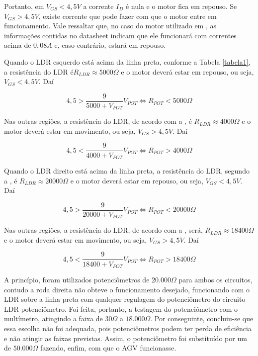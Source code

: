 \documentclass[portuguese]{textolivre}
\begin{document}
Portanto, em $V_{GS} < 4,5V$ a corrente $I_D$ é nula e o motor fica em repouso. Se $V_{GS} > 4,5V$, existe corrente que pode fazer com que o motor entre em funcionamento. Vale ressaltar que, no caso do motor utilizado em \textcite{AlvesMonica2022}, as informações contidas no datasheet indicam que ele funcionará com correntes acima de $0,08A$ e, caso contrário, estará em repouso.

Quando o LDR esquerdo está acima da linha preta, conforme a Tabela \ref{tabela1}, a resistência do LDR $é R_{LDR} \approx 5000\Omega$ e o motor deverá estar em repouso, ou seja, $V_{GS} < 4,5V$. Daí

$$4,5 > \frac{9}{5000 + V_{POT}}V_{POT} \iff R_{POT} < 5000 \Omega$$

Nas outras regiões, a resistência do LDR, de acordo com a , é $R_{LDR} \approx 4000\Omega$ e o motor deverá estar em movimento, ou seja, $V_{GS} > 4,5V$. Daí

$$4,5 < \frac{9}{4000 + V_{POT}}V_{POT} \iff R_{POT} > 4000 \Omega$$

Quando o LDR direito está acima da linha preta, a resistência do LDR, segundo a , é $R_{LDR} \approx 20000\Omega$ e o motor deverá estar em repouso, ou seja, $V_{GS} < 4,5V$. Daí

$$4,5 > \frac{9}{20000 + V_{POT}}V_{POT} \iff R_{POT} < 20000 \Omega$$

Nas outras regiões, a resistência do LDR, de acordo com a , será, $R_{LDR} \approx 18400\Omega$ e o motor deverá estar em movimento, ou seja, $V_{GS}  > 4,5V$. Daí

$$4,5 < \frac{9}{18400 + V_{POT}}V_{POT} \iff R_{POT} > 18400 \Omega$$

A princípio, foram utilizados potenciômetros de $20.000\Omega$ para ambos os circuitos, contudo a roda direita não obteve o funcionamento desejado, funcionando com o LDR sobre a linha preta com qualquer regulagem do potenciômetro do circuito LDR-potenciômetro. Foi feita, portanto, a testagem do potenciômetro com o multímetro, atingindo a faixa de $30\Omega$ a $18.000\Omega$.  Por conseguinte, concluiu-se que essa escolha não foi adequada, pois potenciômetros podem ter perda de eficiência e não atingir as faixas previstas. Assim, o potenciômetro foi substituído por um de $50.000\Omega$ fazendo, enfim, com que o AGV funcionasse.
\end{document}
